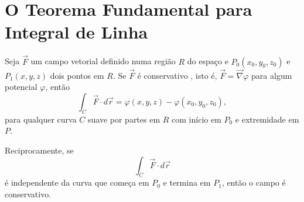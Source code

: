 \section{O Teorema Fundamental para Integral de Linha }
\begin{teo}Seja $\vec{F}$ um campo vetorial definido numa região $R$ do espaço e $P_0(x_0,y_0,z_0)$ e $P_1(x,y,z)$ dois pontos em $R$. Se $\vec{F}$ é conservativo , isto é, $\vec{F}=\vec{\nabla}\varphi$ para algum potencial $\varphi$, então
\begin{equation}\label{TeoFundCalculo}
\int_C\vec{F}\cdot d \vec{r} =\varphi(x,y,z)-\varphi(x_0,y_0,z_0),
\end{equation}
para qualquer curva $C$ suave por partes em $R$ com início em $P_0$ e extremidade em $P$.

Reciprocamente, se
$$
\int_C\vec{F}\cdot d \vec{r}
$$
é independente da curva que começa em $P_0$ e termina em $P_1$, então o campo é conservativo.
\end{teo}

